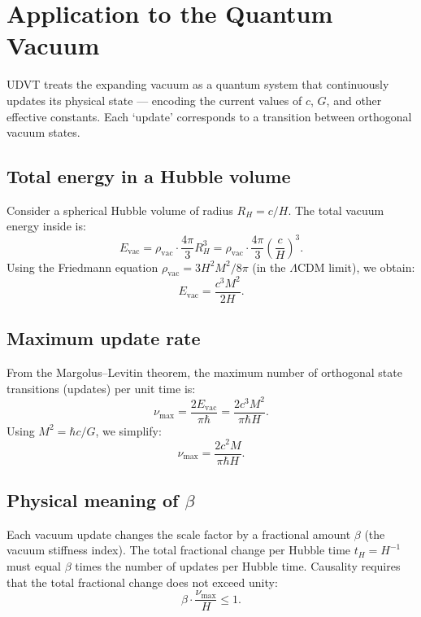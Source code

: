 \documentclass[12pt,a4paper]{book}
\theoremstyle{definition}
\theoremstyle{remark}
\begin{document}
\section{Application to the Quantum Vacuum}

UDVT treats the expanding vacuum as a quantum system that continuously updates its physical state --- encoding the current values of $c$, $G$, and other effective constants. Each `update' corresponds to a transition between orthogonal vacuum states.

\subsection{Total energy in a Hubble volume}

Consider a spherical Hubble volume of radius $R_H = c/H$. The total vacuum energy inside is:
\begin{equation}
    E_{\mathrm{vac}} = \rho_{\mathrm{vac}} \cdot \frac{4\pi}{3} R_H^3 = \rho_{\mathrm{vac}} \cdot \frac{4\pi}{3} \left(\frac{c}{H}\right)^3.
\end{equation}
Using the Friedmann equation $\rho_{\mathrm{vac}} = 3H^2 M^2/8\pi$ (in the $\Lambda$CDM limit), we obtain:
\begin{equation}
    E_{\mathrm{vac}} = \frac{c^3 M^2}{2H}.
\end{equation}

\subsection{Maximum update rate}

From the Margolus--Levitin theorem, the maximum number of orthogonal state transitions (updates) per unit time is:
\begin{equation}
    \nu_{\mathrm{max}} = \frac{2E_{\mathrm{vac}}}{\pi\hbar} = \frac{2c^3 M^2}{\pi\hbar H}.
\end{equation}
Using $M^2 = \hbar c/G$, we simplify:
\begin{equation}
    \nu_{\mathrm{max}} = \frac{2c^2 M}{\pi\hbar H}.
\end{equation}

\subsection{Physical meaning of $\beta$}

Each vacuum update changes the scale factor by a fractional amount $\beta$ (the vacuum stiffness index). The total fractional change per Hubble time $t_H = H^{-1}$ must equal $\beta$ times the number of updates per Hubble time. Causality requires that the total fractional change does not exceed unity:
\begin{equation}
    \beta \cdot \frac{\nu_{\mathrm{max}}}{H} \leq 1.
\end{equation}
\end{document}

